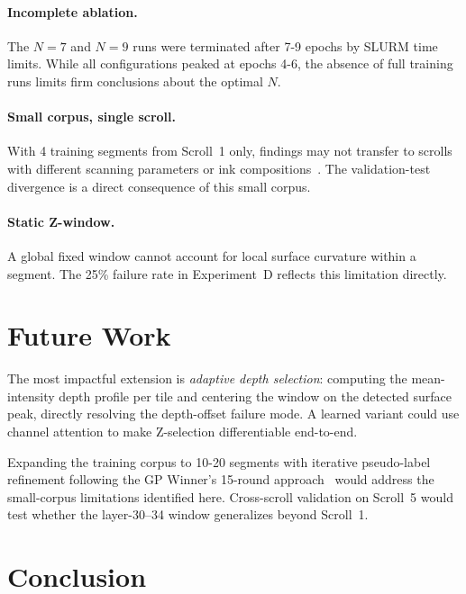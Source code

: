 \paragraph{Incomplete ablation.} The $N = 7$ and $N = 9$ runs were terminated after 7-9 epochs by SLURM time limits. While all configurations peaked at epochs 4-6, the absence of full training runs limits firm conclusions about the optimal $N$.

\paragraph{Small corpus, single scroll.} With 4 training segments from Scroll~1 only, findings may not transfer to scrolls with different scanning parameters or ink compositions~\cite{bukreeva2016virtual}. The validation-test divergence is a direct consequence of this small corpus.

\paragraph{Static Z-window.} A global fixed window cannot account for local surface curvature within a segment. The 25\% failure rate in Experiment~D reflects this limitation directly.

\section{Future Work}
\label{sec:future_work}

The most impactful extension is \emph{adaptive depth selection}: computing the mean-intensity depth profile per tile and centering the window on the detected surface peak, directly resolving the depth-offset failure mode. A learned variant could use channel attention to make Z-selection differentiable end-to-end.

Expanding the training corpus to 10-20 segments with iterative pseudo-label refinement following the GP Winner's 15-round approach~\cite{nader2024gp} would address the small-corpus limitations identified here. Cross-scroll validation on Scroll~5 would test whether the layer-30--34 window generalizes beyond Scroll~1.

\section{Conclusion}
\label{sec:conclusion}

